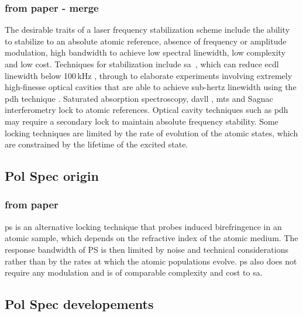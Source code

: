\subsubsection{from paper - merge}
The desirable traits of a laser frequency stabilization scheme include the ability to stabilize to an absolute atomic reference, absence of frequency or amplitude modulation, high bandwidth to achieve low spectral linewidth, low complexity and low cost.
Techniques for stabilization include \gls*{sa}~\cite{maguire_theoretical_2006, haroche_theory_1972, preston_doppler-free_1996}, which can reduce \gls*{ecdl} linewidth below 100\,kHz \cite{cuneo_optically_1994, saliba_linewidths_2009}, through to elaborate experiments involving extremely high-finesse optical cavities that are able to achieve sub-hertz linewidth using the \gls*{pdh} technique \cite{ludlow_compact_2007}.
Saturated absorption spectroscopy, \gls*{davll} \cite{corwin_frequency-stabilized_1998,millett-sikking_davll_2007}, \gls*{mts} \cite{shirley_modulation_1982, mccarron_modulation_2008,xiang-hui_ultra-stable_2009} and Sagnac interferometry \cite{robins_Interferometric_2002,jundt_non-linear_2003} lock to atomic references.
Optical cavity techniques such as \gls*{pdh} \cite{drever_laser_1983} may require a secondary lock to maintain absolute frequency stability.
Some locking techniques are limited by the rate of evolution of the atomic states, which are constrained by the lifetime of the excited state.


\subsection{Pol Spec origin}

\subsubsection{from paper}
\Gls*{ps} \cite{wieman_doppler-free_1976, demtroder_laser_2003} is an alternative locking technique that probes induced birefringence in an atomic sample, which depends on the refractive index of the atomic medium.
The response bandwidth of PS is then limited by noise and technical considerations rather than by the rates at which the atomic populations evolve.
\Gls*{ps} also does not require any modulation and is of comparable complexity and cost to \gls*{sa}.

\subsection{Pol Spec developements}

